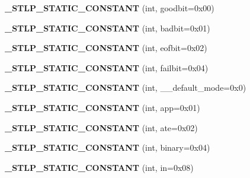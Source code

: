 \begin{DoxyCompactItemize}
\item 
\mbox{\label{classios__base_ad24d5efaea4f2ae0e95db45f1293eebe}} 
{\bfseries \+\_\+\+S\+T\+L\+P\+\_\+\+S\+T\+A\+T\+I\+C\+\_\+\+C\+O\+N\+S\+T\+A\+NT} (int, goodbit=0x00)
\item 
\mbox{\label{classios__base_aefd60cd6fd654fceb1dd889ea741c545}} 
{\bfseries \+\_\+\+S\+T\+L\+P\+\_\+\+S\+T\+A\+T\+I\+C\+\_\+\+C\+O\+N\+S\+T\+A\+NT} (int, badbit=0x01)
\item 
\mbox{\label{classios__base_a52099573c3a6e276c17966056373a797}} 
{\bfseries \+\_\+\+S\+T\+L\+P\+\_\+\+S\+T\+A\+T\+I\+C\+\_\+\+C\+O\+N\+S\+T\+A\+NT} (int, eofbit=0x02)
\item 
\mbox{\label{classios__base_a1676c18dd5bc2eb4d0f361f3143a30be}} 
{\bfseries \+\_\+\+S\+T\+L\+P\+\_\+\+S\+T\+A\+T\+I\+C\+\_\+\+C\+O\+N\+S\+T\+A\+NT} (int, failbit=0x04)
\item 
\mbox{\label{classios__base_a703501e0ca0ae98e46e7b131ed6d95eb}} 
{\bfseries \+\_\+\+S\+T\+L\+P\+\_\+\+S\+T\+A\+T\+I\+C\+\_\+\+C\+O\+N\+S\+T\+A\+NT} (int, \+\_\+\+\_\+default\+\_\+mode=0x0)
\item 
\mbox{\label{classios__base_a8bc9677f34d39e5d34ae45d16187b657}} 
{\bfseries \+\_\+\+S\+T\+L\+P\+\_\+\+S\+T\+A\+T\+I\+C\+\_\+\+C\+O\+N\+S\+T\+A\+NT} (int, app=0x01)
\item 
\mbox{\label{classios__base_a298489f7d5e4fdcb4d05d0db769f9edf}} 
{\bfseries \+\_\+\+S\+T\+L\+P\+\_\+\+S\+T\+A\+T\+I\+C\+\_\+\+C\+O\+N\+S\+T\+A\+NT} (int, ate=0x02)
\item 
\mbox{\label{classios__base_a4d6fa84752ce2cfec0a671c3fe304b96}} 
{\bfseries \+\_\+\+S\+T\+L\+P\+\_\+\+S\+T\+A\+T\+I\+C\+\_\+\+C\+O\+N\+S\+T\+A\+NT} (int, binary=0x04)
\item 
\mbox{\label{classios__base_a0df40a5b3be2712e7b89d3da3dd3b4df}} 
{\bfseries \+\_\+\+S\+T\+L\+P\+\_\+\+S\+T\+A\+T\+I\+C\+\_\+\+C\+O\+N\+S\+T\+A\+NT} (int, in=0x08)
\item 
\mbox{\label{classios__base_a253d11ce17bcedec871ad038c29cc584}} 

\end{DoxyCompactItemize}
